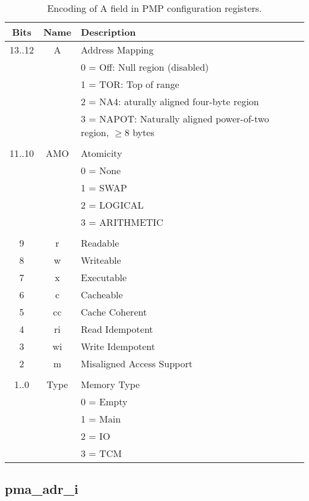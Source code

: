\begin{table*}[ht!]
\begin{center}
\begin{tabular}{|c|c|l|}
\hline
Bits & Name & Description \\
\hline
13..12 & A     & Address Mapping \\
       &       & 0 = Off: Null region (disabled)  \\
       &       & 1 = TOR: Top of range \\
       &       & 2 = NA4: aturally aligned four-byte region \\
       &       & 3 = NAPOT: Naturally aligned power-of-two region, $\ge$8 bytes \\
       &       & \\
11..10 & AMO   & Atomicity  \\
       &       & 0 = None \\
       &       & 1 = SWAP \\
       &       & 2 = LOGICAL \\
       &       & 3 = ARITHMETIC \\
       &       & \\
9      & r     & Readable \\
8      & w     & Writeable \\
7      & x     & Executable \\
6      & c     & Cacheable\\
5      & cc    & Cache Coherent \\
4      & ri    & Read Idempotent \\
3      & wi    & Write Idempotent \\
2      & m     & Misaligned Access Support \\
       &       & \\
1..0   & Type  & Memory Type \\
       &       & 0 = Empty \\
       &       & 1 = Main \\
       &       & 2 = IO \\
       &       & 3 = TCM \\
\hline
\end{tabular}
\end{center}
\caption{Encoding of A field in PMP configuration registers.}
\label{tab:pmacfg}
\end{table*}

\subsection{pma\_adr\_i}

